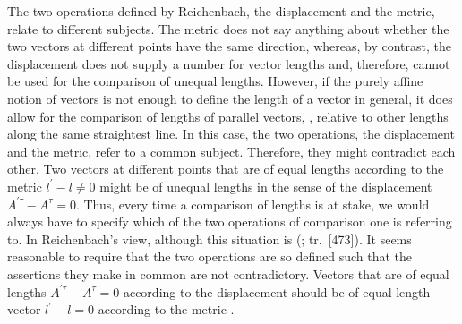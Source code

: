 \documentclass[submitted]{article}
\renewcommand{\rzlap}[2]{(\cite[#1]{Reichenbach1928}; tr.\ [#2])\xspace}
\begin{document}
The two operations defined by Reichenbach, the displacement and the metric, relate to different subjects. The metric does not say anything about whether the two vectors at different points have the same direction, whereas, by contrast, the displacement does not supply a number for vector lengths and, therefore, cannot be used for the comparison of unequal lengths. However, if the purely affine notion of vectors is not enough to define the length of a vector in general, it does allow for the comparison of lengths of parallel vectors, \ie, relative to other lengths along the same straightest line. In this case, the two operations, the displacement and the metric, refer to a common subject. Therefore, they might contradict each other. Two vectors at different points that are of equal lengths according to the metric $l^{\prime}-l \neq 0$ might be of unequal lengths in the sense of the displacement $A^{\prime \tau}-A^{\tau}=0$. Thus, every time a comparison of lengths is at stake, we would always have to specify which of the two operations of comparison one is referring to. In Reichenbach's view, although this situation is  \rzlap{339}{473}. It seems reasonable to require that the two operations are so defined such that the assertions they make in common are not contradictory. Vectors that are of equal lengths $A^{\prime \tau}-A^{\tau}=0$ according to the displacement should be of equal-length vector $l^{\prime}-l = 0$ according to the metric .
\end{document}
